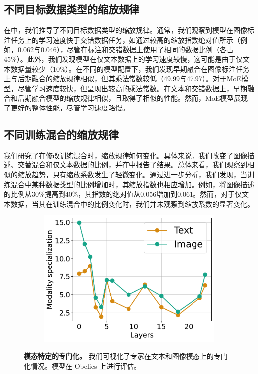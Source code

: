 \subsection{不同目标数据类型的缩放规律}
在中，我们推导了不同目标数据类型的缩放规律。通常，我们观察到模型在图像标注任务上的学习速度快于交错数据任务，如通过较高的缩放指数绝对值所示（例如，0.062与0.046），尽管在标注和交错数据上使用了相同的数据比例（各占45\%）。此外，我们发现模型在仅文本数据上的学习速度较慢，这可能是由于仅文本数据量较少（10\%）。在不同的模型配置下，我们发现早期融合在图像标注任务上与后期融合的缩放规律相似，但其乘法常数较低（49.99与47.97）。对于MoE模型，尽管学习速度较快，但呈现出较高的乘法常数。在文本和交错数据上，早期融合和后期融合模型的缩放规律相似，且取得了相似的性能。然而，MoE模型展现了更好的整体性能，尽管学习速度略慢。
\subsection{不同训练混合的缩放规律}

我们研究了在修改训练混合时，缩放规律如何变化。具体来说，我们改变了图像描述、交替混合和仅文本数据的比例，并在中报告了结果。总体来看，我们观察到相似的缩放趋势，只有缩放系数发生了轻微变化。通过进一步分析，我们发现，当训练混合中某种数据类型的比例增加时，其缩放指数也相应增加。例如，将图像描述的比例从30\%提高到40\%，其指数的绝对值从0.056增加到0.061。然而，对于仅文本数据，当其在训练混合中的比例变化时，我们并未观察到缩放系数的显著变化。

\begin{figure}
        \vspace{-4mm}
        \centering
        \captionsetup{type=figure}
        \begin{subfigure}[t]{\linewidth}
            \includegraphics[width=1.0\textwidth]{assets/moes/specialization/model1088/modality_specialization_1088_150_across_layers.pdf}
        \end{subfigure}

        \caption{\textbf{模态特定的专门化。} 我们可视化了专家在文本和图像模态上的专门化情况。模型在 Obelics 上进行评估。}
        \label{fig:app_moes_specialization}
\end{figure}

